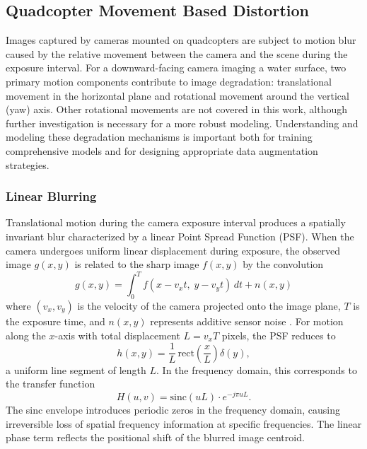 \subsection{Quadcopter Movement Based Distortion}

Images captured by cameras mounted on quadcopters are subject to motion blur caused by the relative movement between the camera and the scene during the exposure interval. For a downward-facing camera imaging a water surface, two primary motion components contribute to image degradation: translational movement in the horizontal plane and rotational movement around the vertical (yaw) axis. Other rotational movements are not covered in this work, although further investigation is necessary for a more robust modeling. Understanding and modeling these degradation mechanisms is important both for training comprehensive models and for designing appropriate data augmentation strategies.

    \subsubsection{Linear Blurring}

    Translational motion during the camera exposure interval produces a spatially invariant blur characterized by a linear Point Spread Function (PSF). When the camera undergoes uniform linear displacement during exposure, the observed image $g(x, y)$ is related to the sharp image $f(x, y)$ by the convolution
    \begin{equation}
        g(x, y) = \int_0^T f(x - v_x t, \; y - v_y t) \, dt + n(x, y)
        \label{eq:motion_blur_convolution}
    \end{equation}
    where $(v_x, v_y)$ is the velocity of the camera projected onto the image plane, $T$ is the exposure time, and $n(x, y)$ represents additive sensor noise \cite{GonzalezWoods2018}. For motion along the $x$-axis with total displacement $L = v_x T$ pixels, the PSF reduces to
    \begin{equation}
        h(x, y) = \frac{1}{L} \, \mathrm{rect}\!\left(\frac{x}{L}\right) \delta(y),
        \label{eq:linear_psf}
    \end{equation}
    a uniform line segment of length $L$. In the frequency domain, this corresponds to the transfer function
    \begin{equation}
        H(u, v) = \mathrm{sinc}(uL) \cdot e^{-j\pi u L} .
        \label{eq:linear_otf}
    \end{equation}
    The sinc envelope introduces periodic zeros in the frequency domain, causing irreversible loss of spatial frequency information at specific frequencies. The linear phase term reflects the positional shift of the blurred image centroid.

